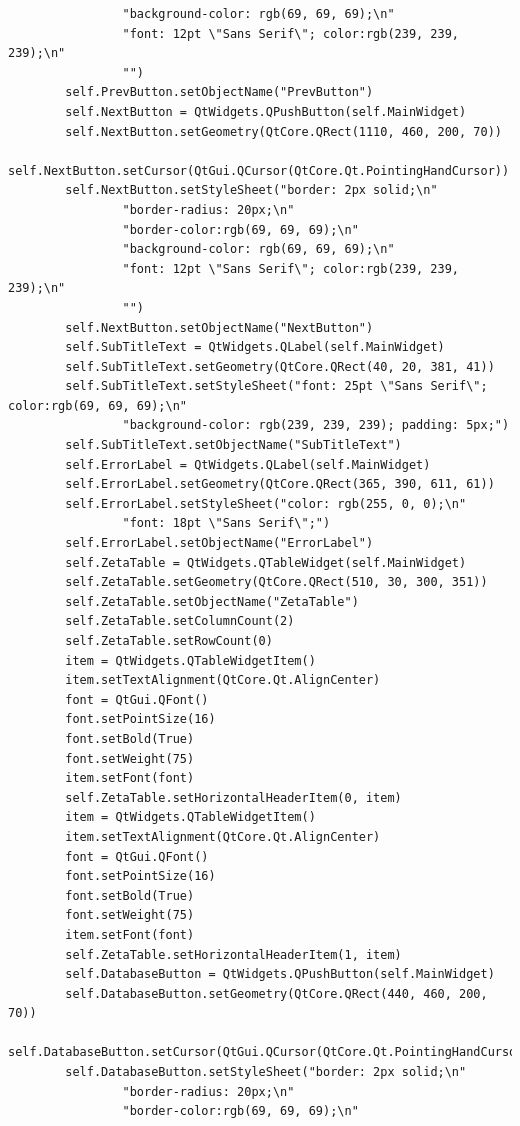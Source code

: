 \documentclass[12pt]{article}
\begin{document}
\begin{lstlisting}
                "background-color: rgb(69, 69, 69);\n"
                "font: 12pt \"Sans Serif\"; color:rgb(239, 239, 239);\n"
                "")
        self.PrevButton.setObjectName("PrevButton")
        self.NextButton = QtWidgets.QPushButton(self.MainWidget)
        self.NextButton.setGeometry(QtCore.QRect(1110, 460, 200, 70))
        self.NextButton.setCursor(QtGui.QCursor(QtCore.Qt.PointingHandCursor))
        self.NextButton.setStyleSheet("border: 2px solid;\n"
                "border-radius: 20px;\n"
                "border-color:rgb(69, 69, 69);\n"
                "background-color: rgb(69, 69, 69);\n"
                "font: 12pt \"Sans Serif\"; color:rgb(239, 239, 239);\n"
                "")
        self.NextButton.setObjectName("NextButton")
        self.SubTitleText = QtWidgets.QLabel(self.MainWidget)
        self.SubTitleText.setGeometry(QtCore.QRect(40, 20, 381, 41))
        self.SubTitleText.setStyleSheet("font: 25pt \"Sans Serif\"; color:rgb(69, 69, 69);\n"
                "background-color: rgb(239, 239, 239); padding: 5px;")
        self.SubTitleText.setObjectName("SubTitleText")
        self.ErrorLabel = QtWidgets.QLabel(self.MainWidget)
        self.ErrorLabel.setGeometry(QtCore.QRect(365, 390, 611, 61))
        self.ErrorLabel.setStyleSheet("color: rgb(255, 0, 0);\n"
                "font: 18pt \"Sans Serif\";")
        self.ErrorLabel.setObjectName("ErrorLabel")
        self.ZetaTable = QtWidgets.QTableWidget(self.MainWidget)
        self.ZetaTable.setGeometry(QtCore.QRect(510, 30, 300, 351))
        self.ZetaTable.setObjectName("ZetaTable")
        self.ZetaTable.setColumnCount(2)
        self.ZetaTable.setRowCount(0)
        item = QtWidgets.QTableWidgetItem()
        item.setTextAlignment(QtCore.Qt.AlignCenter)
        font = QtGui.QFont()
        font.setPointSize(16)
        font.setBold(True)
        font.setWeight(75)
        item.setFont(font)
        self.ZetaTable.setHorizontalHeaderItem(0, item)
        item = QtWidgets.QTableWidgetItem()
        item.setTextAlignment(QtCore.Qt.AlignCenter)
        font = QtGui.QFont()
        font.setPointSize(16)
        font.setBold(True)
        font.setWeight(75)
        item.setFont(font)
        self.ZetaTable.setHorizontalHeaderItem(1, item)
        self.DatabaseButton = QtWidgets.QPushButton(self.MainWidget)
        self.DatabaseButton.setGeometry(QtCore.QRect(440, 460, 200, 70))
        self.DatabaseButton.setCursor(QtGui.QCursor(QtCore.Qt.PointingHandCursor))
        self.DatabaseButton.setStyleSheet("border: 2px solid;\n"
                "border-radius: 20px;\n"
                "border-color:rgb(69, 69, 69);\n"

\end{lstlisting}
\end{document}
